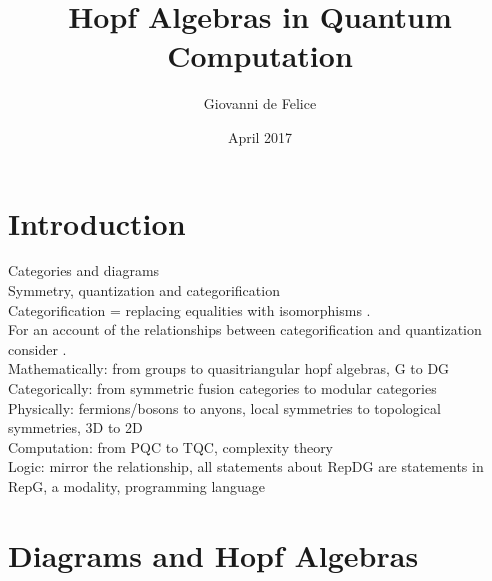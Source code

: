 \documentclass{article}
\title{Hopf Algebras in Quantum Computation}
\author{Giovanni de Felice}
\date{April 2017}
\begin{document}
\maketitle
\tableofcontents

\pagebreak
\section{Introduction}
Categories and diagrams \\
Symmetry, quantization and categorification \\
Categorification = replacing equalities with isomorphisms \cite{Baez98}.\\
For an account of the relationships between categorification and quantization consider \cite{Rowell17}.\\
Mathematically: from groups to quasitriangular hopf algebras, G to DG\\
Categorically: from symmetric fusion categories to modular categories\\
Physically: fermions/bosons to anyons, local symmetries to topological symmetries, 3D to 2D\\
Computation: from PQC to TQC, complexity theory\\
Logic: mirror the relationship, all statements about RepDG are statements in RepG, a modality, programming language

\section{Diagrams and Hopf Algebras}
\end{document}
